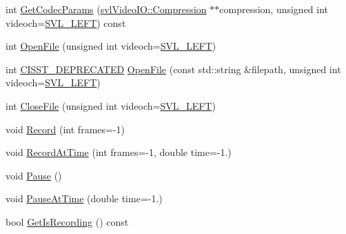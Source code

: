\begin{DoxyCompactItemize}
\item 
int \hyperlink{classsvl_filter_video_file_writer_a23c048a6a4f6a942ef6e27d27f378fd3}{Get\+Codec\+Params} (\hyperlink{classsvl_video_i_o_a932d071ec9be4fefde824ab9b9125282}{svl\+Video\+I\+O\+::\+Compression} $\ast$$\ast$compression, unsigned int videoch=\hyperlink{svl_definitions_8h_ab9fec7615f19c8df2919eebcab0b187f}{S\+V\+L\+\_\+\+L\+E\+F\+T}) const 
\item 
int \hyperlink{classsvl_filter_video_file_writer_a16915fe55932d252273543e17f759ac1}{Open\+File} (unsigned int videoch=\hyperlink{svl_definitions_8h_ab9fec7615f19c8df2919eebcab0b187f}{S\+V\+L\+\_\+\+L\+E\+F\+T})
\item 
int \hyperlink{cmn_portability_8h_a63da7164735f9501be651b1f2bbc0121}{C\+I\+S\+S\+T\+\_\+\+D\+E\+P\+R\+E\+C\+A\+T\+E\+D} \hyperlink{classsvl_filter_video_file_writer_a15630ad3c0016cb266c9b44310951d53}{Open\+File} (const std\+::string \&filepath, unsigned int videoch=\hyperlink{svl_definitions_8h_ab9fec7615f19c8df2919eebcab0b187f}{S\+V\+L\+\_\+\+L\+E\+F\+T})
\item 
int \hyperlink{classsvl_filter_video_file_writer_a21f6fb227f859747341af2acc0631188}{Close\+File} (unsigned int videoch=\hyperlink{svl_definitions_8h_ab9fec7615f19c8df2919eebcab0b187f}{S\+V\+L\+\_\+\+L\+E\+F\+T})
\item 
void \hyperlink{classsvl_filter_video_file_writer_a2c07c6cc97d15edffdcc2b723eb69cc0}{Record} (int frames=-\/1)
\item 
void \hyperlink{classsvl_filter_video_file_writer_a0f012c2a7cfc7a75c8523dc785416699}{Record\+At\+Time} (int frames=-\/1, double time=-\/1.)
\item 
void \hyperlink{classsvl_filter_video_file_writer_aee6594a4dbe6a8537850f4649710780e}{Pause} ()
\item 
void \hyperlink{classsvl_filter_video_file_writer_a48139523b22e390cbf62aee4774fe33c}{Pause\+At\+Time} (double time=-\/1.)
\item 
bool \hyperlink{classsvl_filter_video_file_writer_a0be6b6136e1df7b4a6b8444deea30753}{Get\+Is\+Recording} () const 
\end{DoxyCompactItemize}
